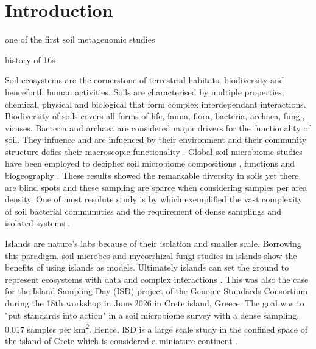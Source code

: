 \documentclass[unnumsec,webpdf,contemporary,large]{oup-authoring-template}%
\theoremstyle{thmstyleone}%
\theoremstyle{thmstyletwo}%
\theoremstyle{thmstylethree}%
\begin{document}
\maketitle

\section{Introduction}\label{intro}

one of the first soil metagenomic studies \cite{fierer2012cross-biome}

history of 16s \cite{}

\cite{baykal2024genomic}
Soil ecosystems are the cornerstone of terrestrial habitats, biodiversity and henceforth human activities.
Soils are characterised by multiple properties; chemical, physical and biological that 
form complex interdependant interactions. Biodiversity of soils covers
all forms of life, fauna, flora, bacteria, archaea, fungi, viruses. 
Bacteria and archaea are considered major drivers for the functionality of soil.
They infuence and are infuenced by their environment and their community structure 
defies their macroscopic functionality \cite{Bahram2018}.
Global soil microbiome studies have been employed to decipher soil microbiome
compositions \cite{thompson2017a-communal, Delgado-Baquerizo2018, Labouyrie2023},
functions \cite{Bahram2018} and biogeography \cite{Martiny2006, Guerra2020}.
These results showed the remarkable diversity in soils yet there are blind spots \cite{Guerra2020}
and these sampling are sparce when considering samples per area density. One of most resolute
study is by \cite{Karimi2020} which exemplified the 
vast complexity of soil bacterial communuties and the requirement of
dense samplings and isolated systems \cite{Dini-Andreote2021}.

Islands are nature's labs \cite{Whittaker2017} because of their isolation and smaller scale.
Borrowing this paradigm, soil microbes \cite{Li2020} and mycorrhizal fungi \cite{Delavaux2021} studies
in islands show the benefits of using islands as models. Ultimately islands can
set the ground to represent ecosystems with data and complex interactions \cite{Davies2016}.
This was also the case for the Island Sampling Day (ISD) project \cite{holm2024}
of the Genome Standards Consortium \cite{Field2011}
during the 18th workshop in June 2026 in Crete island, Greece. The goal was to "put standards into action"
in a soil microbiome survey with a dense sampling, 0.017 samples per km\textsuperscript{2}.
Hence, ISD is a large scale study in the confined space of the island of Crete which 
is considered a miniature continent \cite{Vogiatzakis2008_crete}.
\end{document}
